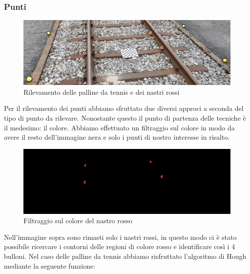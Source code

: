 \documentclass[twoside]{supsistudent}
\begin{document}
\subsubsection{Punti}
\begin{figure}[H]
  \center
  \includegraphics[scale=0.08]{images/points.jpg}
  \caption{Rilevamento delle palline da tennis e dei nastri rossi}
\end{figure}
Per il rilevamento dei punti abbiamo sfruttato due diversi approci a seconda del tipo di punto da rilevare. Nonostante questo il punto di 
partenza delle tecniche è il medesimo: il colore. Abbiamo effettuato un filtraggio sul colore in modo da avere il resto dell'immagine
nera e solo i punti di nostro interesse in risalto. 
\begin{figure}[H]
  \center
  \includegraphics[scale=0.08]{images/points1.jpg}
  \caption{Filtraggio sul colore del nastro rosso}
\end{figure}
Nell'immagine sopra sono rimasti solo i nastri rossi, in questo modo ci è stato possibile ricercare i contorni delle regioni di colore rosso e 
identificare così i 4 bulloni. Nel caso delle palline da tennis abbiamo risfruttato l'algoritmo di Hough mediante la seguente funzione:
\end{document}
